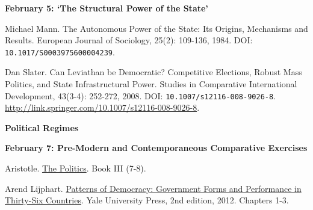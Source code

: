 \documentclass[letterpaper]{article}
\renewenvironment{itemize}{
  \begin{list}{}{
    \setlength{\leftmargin}{1.5em}
  }
}{
  \end{list}
}
\begin{document}
\begin{enumerate}
\begin{itemize}
	\item {\bf February 5: `The Structural Power of the State'}
		\begin{itemize}
			\item[$\bullet$] Michael Mann. The Autonomous Power of the State: Its Origins, Mechanisms and Results. European Journal of Sociology, 25(2): 109-136, 1984. DOI: \texttt{10.1017/S0003975600004239}.
			\item[$\bullet$] Dan Slater. Can Leviathan be Democratic? Competitive Elections, Robust Mass Politics, and State Infrastructural Power. Studies in Comparative International Development, 43(3-4): 252-272, 2008. DOI: \texttt{10.1007/s12116-008-9026-8}. \url{http://link.springer.com/10.1007/s12116-008-9026-8}.
		\end{itemize}
	\end{itemize}





\item {\bf Political Regimes}
	\begin{itemize}

		\item {\bf February 7: Pre-Modern and Contemporaneous Comparative Exercises}
			\begin{itemize}
				\item[$\bullet$] Aristotle. \href{https://socialsciences.mcmaster.ca/econ/ugcm/3ll3/aristotle/Politics.pdf}{The Politics}. Book III (7-8).
				\item[$\bullet$] Arend Lijphart. \href{https://e-edu.nbu.bg/pluginfile.php/830138/mod_resource/content/1/Lijphart%2C%20A.%20Patterns%20of%20Democracy%20-%20Government%20Forms%20and%20Performance%20in%20Thirty-Six%20Countries%20%282012%29.pdf}{Patterns of Democracy: Government Forms and Performance in Thirty-Six Countries}. Yale University Press, 2nd edition, 2012. Chapters 1-3.
			\end{itemize}
	\end{itemize}


\vspace{3mm}

\begin{itemize}


\end{itemize}
\end{enumerate}
\end{document}
